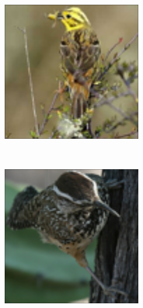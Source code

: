 \documentclass[times, utf8, proizvoljni, numeric]{fer}
\newcommand{\rulesep}{\unskip\ \vrule\ }
\begin{document}
\begin{figure}[ht!]
	\begin{subfigure}[t]{0.24\textwidth}
		\includegraphics[width=\textwidth,height=\textwidth ]{./imgs/demo-preporucitelja-po-sadrzaju/tijek-rada/id@0.png}
	\end{subfigure}
	\rulesep
	\begin{subfigure}[t]{0.24\textwidth}
		\includegraphics[width=\textwidth,height=\textwidth]{./imgs/demo-preporucitelja-po-sadrzaju/tijek-rada/id@182.png}

\end{subfigure}
\end{figure}
\end{document}
